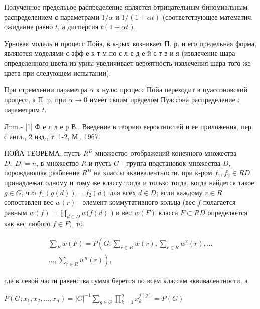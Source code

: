 \documentclass[10pt]{article}
\begin{document}
Полученное пределььое распределение является отрицательным биномиальным распределением с параметрами $1 / \alpha$ и $1 /(1+\alpha t)$ (соответствующее математич. ожидание равно $t$, а дисперсия $t(1+\alpha t)$.



Урновая модель и процесс Пойа, в к-рых возникает П. р. и его предельная форма, являются моделями с әфф е к т м по с л е д е й с т в и я (извлечение шара определенного цвета из урны увеличивает вероятность извлечения шара того же цвета при следующем испытании).



При стремлении параметра $\alpha$ к нулю процесс Пойа переходит в пуассоновский процесс, а П. р. при $\alpha \rightarrow 0$ имеет своим пределом Пуассона распределение с параметром $t$.



Лum.- [1] Ф е л л е р В., Введение в теорию вероятностей и ее приложения, пер. с англ., 2 изд., т. 1-2, М., 1967.



ПОЙА ТЕОРЕМА: пусть $R^{D}$ множество отображений конечного множества $D,|D|=n$, в множество $R$ и пусть $G$ - групга подстановок множества $D$, порождающая разбиение $R^{D}$ на классы эквивалентности. при к-ром $f_{1}, f_{2} \in R D$ принадлежат одному и тому же классу тогда и только тогда, когда найдется такое $g \in G$, что $f_{1}(g(d))=f_{2}(d)$ для всех $d \in D$; если каждому $r \in R$ сопоставлен вес $w(r)$ - элемент коммутативного кольца (вес $f$ полагается равным $w(f)=\prod_{d \in D} w(f(d)$ ) и вес $w(F)$ класса $F \subset R D$ определяется как вес любого $f \in F)$, то



\[

\begin{gathered}

\sum_{F} w(F)=P\left(G ; \sum_{r \in R} w(r), \sum_{r \in R} w^{2}(r), \ldots\right. \\

\left.\ldots, \sum_{r \in R} w^{n}(r)\right),

\end{gathered}

\]



где в левой части равенства сумма берется по всем классам эквивалентности, а



$P\left(G ; x_{1}, x_{2}, \ldots, x_{n}\right)=|G|^{-1} \sum_{g \in G} \prod_{k=1}^{n} x_{k}^{j(g)}=P(G)$
\end{document}
